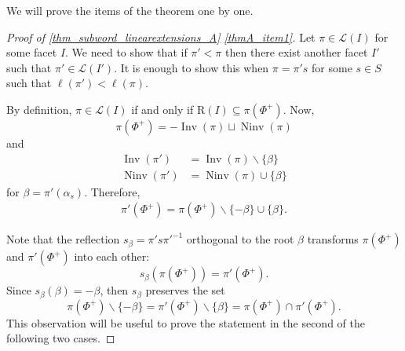\documentclass{amsart}
\theoremstyle{definition}
\DeclareMathOperator{\Inv}{Inv} %
\DeclareMathOperator{\Ninv}{Ninv} %
\newcommand{\linearExtensions}{\mathcal{L}} %
\newcommand{\Roots}{\mathrm{R}} %
\begin{document}
We will prove the items of the theorem one by one.

\begin{proof}[Proof of \cref{thm_subword_linearextensions_A} \eqref{thmA_item1}]
Let $\pi\in \linearExtensions(I)$ for some facet $I$.
We need to show that if $\pi'<\pi$ then there exist another facet $I'$ such that $\pi'\in \linearExtensions(I')$.
It is enough to show this when $\pi=\pi' s$ for some $s\in S$ such that $\ell(\pi')<\ell(\pi)$.

By definition, $\pi\in \linearExtensions(I)$ if and only if $\Roots(I)\subseteq \pi(\Phi^+)$.
Now, 
\[
\pi(\Phi^+)= -\Inv(\pi)\sqcup \Ninv(\pi)
\]  
and 
\begin{align*}
    \Inv(\pi') &=\Inv(\pi)\smallsetminus \{\beta\} \\
    \Ninv(\pi') &= \Ninv(\pi) \cup \{\beta\}
\end{align*}
for $\beta=\pi'(\alpha_s)$.
Therefore,
\begin{align*}
    \pi'(\Phi^+) = \pi(\Phi^+) \smallsetminus \{-\beta\} \cup \{\beta\}.
\end{align*}

\begin{center}
%
\qquad
%
\end{center}
%
Note that the reflection $s_\beta=\pi's\pi'^{-1}$ orthogonal to the root $\beta$ transforms $\pi(\Phi^+)$ and $\pi'(\Phi^+)$ into each other:
\[
s_\beta(\pi(\Phi^+))=\pi'(\Phi^+).
\]
Since $s_\beta(\beta)= -\beta$, then $s_\beta$ preserves the set 
\[
\pi(\Phi^+)\smallsetminus \{-\beta\}=
\pi'(\Phi^+)\smallsetminus \{\beta\}=
\pi(\Phi^+)\cap \pi'(\Phi^+).
\]
This observation will be useful to prove the statement in the second of the following two cases.


\end{proof}
\end{document}
